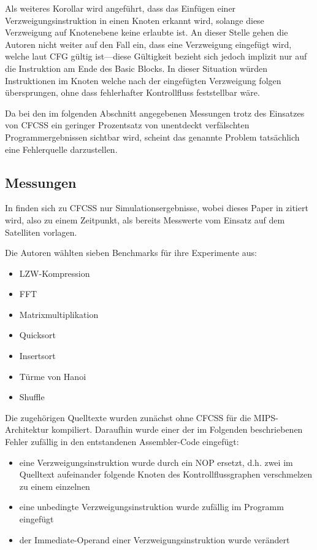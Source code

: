 \documentclass[11pt]{article}
\begin{document}
Als weiteres Korollar wird angeführt, dass das Einfügen einer
Verzweigungsinstruktion in einen Knoten erkannt wird, solange diese Verzweigung
auf Knotenebene keine erlaubte ist. An dieser Stelle gehen die Autoren nicht
weiter auf den Fall ein, dass eine Verzweigung eingefügt wird, welche laut CFG
gültig ist—diese Gültigkeit bezieht sich jedoch implizit nur auf die
Instruktion am Ende des Basic Blocks. In dieser Situation würden Instruktionen
im Knoten welche nach der eingefügten Verzweigung folgen übersprungen, ohne
dass fehlerhafter Kontrollfluss feststellbar wäre.

Da bei den im folgenden Abschnitt angegebenen Messungen trotz des Einsatzes von
CFCSS ein geringer Prozentsatz von unentdeckt verfälschten Programmergebnissen
sichtbar wird, scheint das genannte Problem tatsächlich eine Fehlerquelle
darzustellen.

\subsection{Messungen}

In \cite{oh-2002-control} finden sich zu CFCSS nur Simulationsergebnisse, wobei
dieses Paper in \cite{argos-2002-lessons} zitiert wird, also zu einem
Zeitpunkt, als bereits Messwerte vom Einsatz auf dem Satelliten vorlagen.

Die Autoren wählten sieben Benchmarks für ihre Experimente aus:

\begin{itemize}
  \item LZW-Kompression
  \item FFT
  \item Matrixmultiplikation
  \item Quicksort
  \item Insertsort
  \item Türme von Hanoi
  \item Shuffle
\end{itemize}

Die zugehörigen Quelltexte wurden zunächst ohne CFCSS für die MIPS-Architektur
kompiliert. Daraufhin wurde einer der im Folgenden beschriebenen Fehler
zufällig in den entstandenen Assembler-Code eingefügt:

\begin{itemize}
  \item eine Verzweigungsinstruktion wurde durch ein NOP ersetzt,
        d.h. zwei im Quelltext aufeinander folgende Knoten des Kontrollflussgraphen
        verschmelzen zu einem einzelnen
  \item eine unbedingte Verzweigungsinstruktion wurde zufällig im Programm eingefügt
  \item der Immediate-Operand einer Verzweigungsinstruktion wurde verändert
\end{itemize}
\end{document}
